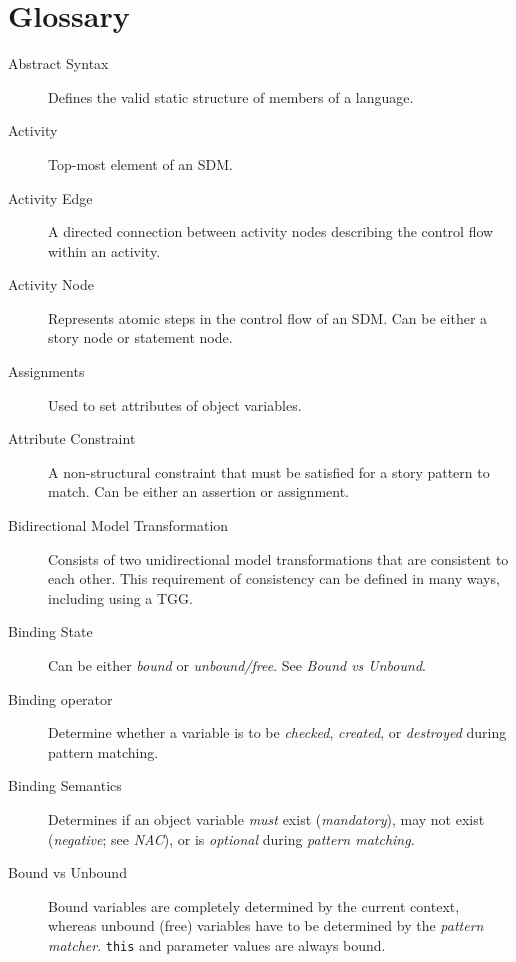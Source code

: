 \newpage
\genHeader
\chapter{Glossary}

\begin{description}

\item[Abstract Syntax] %
Defines the valid static structure of members of a language. 

\item[Activity] %
Top-most element of an SDM.

\item[Activity Edge] %
A directed connection between activity nodes describing the control flow within an activity.

\item[Activity Node] %
Represents atomic steps in the control flow of an SDM. Can be either a story node or statement node.

\item[Assignments] %
Used to set attributes of object variables.

\item[Attribute Constraint] %
A non-structural constraint that must be satisfied for a story pattern to match. Can be either an assertion or assignment.

\item[Bidirectional Model Transformation] %
Consists of two unidirectional mo\-del transformations that are consistent to each other.
This requirement of consistency can be defined in many ways, including using a TGG.

\item[Binding State] %
Can be either \emph{bound} or \emph{unbound/free}. See \emph{Bound vs Unbound}.

\item[Binding operator] %
Determine whether a variable is to be \emph{checked}, \emph{created}, or \emph{destroyed} during pattern matching.

\item[Binding Semantics] %
Determines if an object variable \emph{must} exist (\emph{mandatory}), may not exist (\emph{negative}; see \emph{NAC}), or is \emph{optional} during
\emph{pattern matching}.

\item[Bound vs Unbound] %
Bound variables are completely determined by the current context, whereas unbound (free) variables have to be determined by the \emph{pattern matcher}.
\texttt{this} and parameter values are always bound.


\end{description}
